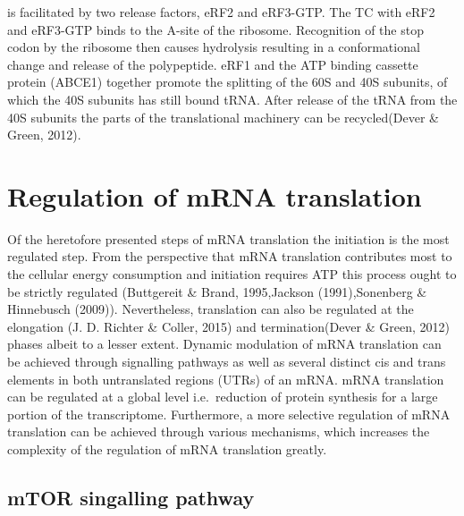 \documentclass[12pt,openany]{book}
\begin{document}
is facilitated by two release factors, eRF2 and eRF3-GTP. The TC with
eRF2 and eRF3-GTP binds to the A-site of the ribosome. Recognition of
the stop codon by the ribosome then causes hydrolysis resulting in a
conformational change and release of the polypeptide. eRF1 and the ATP
binding cassette protein (ABCE1) together promote the splitting of the
60S and 40S subunits, of which the 40S subunits has still bound tRNA.
After release of the tRNA from the 40S subunits the parts of the
translational machinery can be recycled(Dever \& Green, 2012).

\section{Regulation of mRNA translation}

Of the heretofore presented steps of mRNA translation the initiation is
the most regulated step. From the perspective that mRNA translation
contributes most to the cellular energy consumption and initiation
requires ATP this process ought to be strictly regulated (Buttgereit \&
Brand, 1995,Jackson (1991),Sonenberg \& Hinnebusch (2009)).
Nevertheless, translation can also be regulated at the elongation (J. D.
Richter \& Coller, 2015) and termination(Dever \& Green, 2012) phases
albeit to a lesser extent. Dynamic modulation of mRNA translation can be
achieved through signalling pathways as well as several distinct cis and
trans elements in both untranslated regions (UTRs) of an mRNA. mRNA
translation can be regulated at a global level i.e.~reduction of protein
synthesis for a large portion of the transcriptome. Furthermore, a more
selective regulation of mRNA translation can be achieved through various
mechanisms, which increases the complexity of the regulation of mRNA
translation greatly.

\subsection{mTOR singalling pathway}
\end{document}

